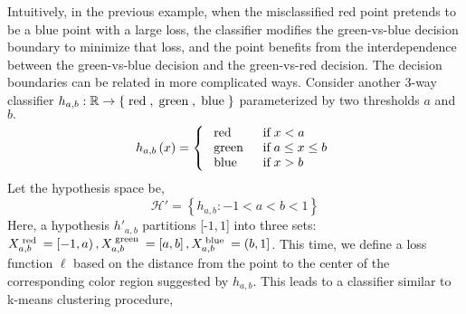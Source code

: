 \documentclass{article}
\begin{document}
\begin{figure}[H] \centering {} \label{fig:2dam}
\end{figure}
Intuitively, in the previous example, when the misclassified red point pretends to be a blue point with a large loss, the classifier modifies the green-vs-blue decision boundary to minimize that loss, and the point benefits from the interdependence between the green-vs-blue decision and the green-vs-red decision.
\newline \newline
The decision boundaries can be related in more complicated ways. Consider another $3$-way classifier $h_{a, b} : \mathbb{R} \to  \left\{\text{\;red\;}, \text{\;green\;}, \text{\;blue\;}\right\}$ parameterized by two thresholds $a $ and $b. $
\begin{equation} h_{a, b}\left(x\right) =\left\{ \begin{array}{ll}
\text{\;red\;}& \text{\;if\;} x < a \\
\text{\;green\;}& \text{\;if\;} a \leq  x \leq  b \\
\text{\;blue\;}& \text{\;if\;} x > b \\
\end{array}\right. \end{equation}
Let the hypothesis space be,
\begin{equation} 
\mathcal{H}' = \left\{h_{a, b} : -1 < a < b < 1\right\}
\end{equation}
Here, a hypothesis $h'_{a, b}$ partitions [-$1, 1$] into three sets: $X^{\text{\;red\;}}_{a, b} = \left[-1, a\right), X^{\text{\;green\;}}_{a, b} = \left[a, b\right], X^{\text{\;blue\;}}_{a, b} = \left(b, 1\right]$. This time, we define a loss function $\ell$ based on the distance from the point to the center of the corresponding color region suggested by $h_{a, b}$. This leads to a classifier similar to k-means clustering procedure,
\end{document}
